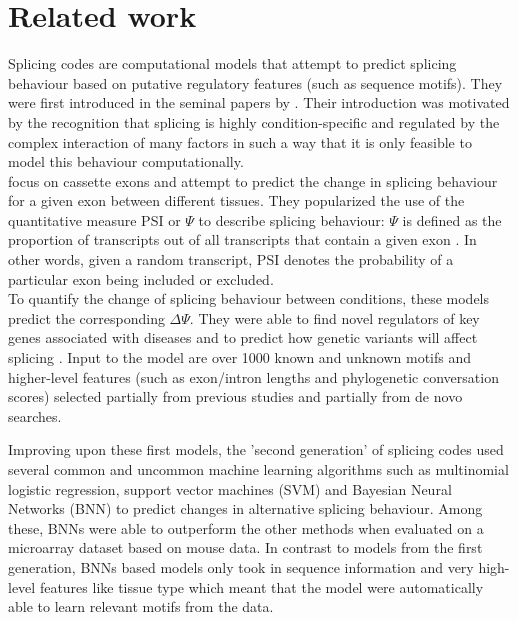 \chapter{\label{ch:3-relatedwork}Related work}

Splicing codes are computational models that attempt to predict splicing behaviour based on putative regulatory features (such as sequence motifs).
They were first introduced in the seminal papers by \cite{barash2010a}\cite{barash2010b}. Their introduction was motivated by the recognition that splicing is highly condition-specific and regulated by the complex interaction of many factors in such a way that it is only feasible to model this behaviour computationally.\\
\cite{barash2010a} focus on cassette exons and attempt to predict the change in splicing behaviour for a given exon between different tissues. They popularized the use of the quantitative measure PSI or $\Psi$ to describe splicing behaviour:
$\Psi$ is defined as the proportion of transcripts out of all transcripts that contain a given exon \cite{psi}. In other words, given a random transcript, PSI denotes the probability of a particular exon being included or excluded.\\
To quantify the change of splicing behaviour between conditions, these models predict the corresponding $\Delta \Psi$. They were able to find novel regulators of key genes associated with diseases and to predict how genetic variants will affect splicing \cite{splicingcodegood1} \cite{splicingcodegood2}. Input to the model are over 1000 known and unknown motifs and higher-level features (such as exon/intron lengths and phylogenetic conversation scores) selected partially from previous studies and partially from de novo searches.


Improving upon these first models, the 'second generation' of splicing codes used several common and uncommon machine learning algorithms such as multinomial logistic regression, support vector machines (SVM) and Bayesian Neural Networks (BNN) to predict changes in alternative splicing behaviour. \cite{bnnsplicing} Among these, BNNs were able to outperform the other methods when evaluated on a microarray dataset based on mouse data. In contrast to models from the first generation, BNNs based models only took in sequence information and very high-level features like tissue type which meant that the model were automatically able to learn relevant motifs from the data.


